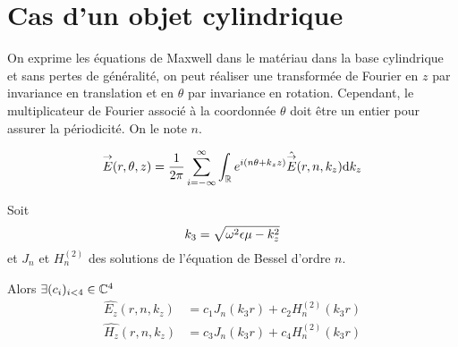 \section{Cas d'un objet cylindrique}


    \begin{figure}[!hbt]
        \centering
        \begin{tikzpicture}
            
        \end{tikzpicture}
    \end{figure}

    On exprime les équations de Maxwell dans le matériau dans la base cylindrique et sans pertes de généralité, on peut réaliser une transformée de Fourier en $z$ par invariance en translation et en $\theta$ par invariance en rotation. Cependant, le multiplicateur de Fourier associé à la coordonnée $\theta$ doit être un entier pour assurer la périodicité. On le note $n$.

    \begin{equation}
        \vE(r,\theta,z) = \frac{1}{2\pi}\sum_{i=-\infty}^{\infty}\int_{\RR} e^{i(n \theta + k_z z )}\hat{\vE} (r,n,k_z) \dd{k_z}
    \end{equation}

    \begin{prop}
        Soit
        \begin{equation}
            k_3 = \sqrt{\w^2\eps\mu - k_z^2}
        \end{equation}
        et $J_n$ et $H_n^{(2)}$ des solutions de l'équation de Bessel d'ordre $n$.
        
        Alors $\exists (c_i)_{i<4} \in \CC^4$
        \begin{subequations}
            \begin{align}
                \hat{E_z}(r,n,k_z) &= c_1 J_n\left(k_3r\right) + c_2 H_n^{(2)}\left(k_3r\right)
                \\
                \hat{H_z}(r,n,k_z) &= c_3 J_n\left(k_3r\right) + c_4 H_n^{(2)}\left(k_3r\right)
            \end{align}
        \end{subequations}
    \end{prop}

